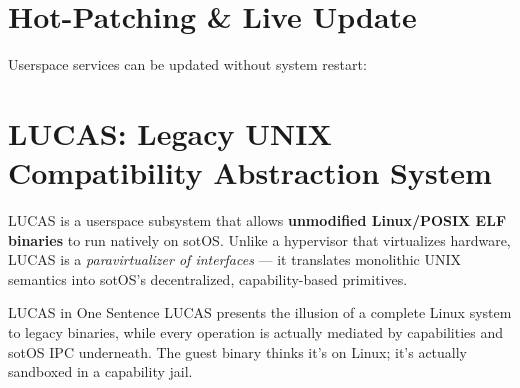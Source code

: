\documentclass[11pt,a4paper]{article}
\begin{document}
\section{Hot-Patching \& Live Update}

Userspace services can be updated without system restart:

\begin{center}
\end{center}

\section{LUCAS: Legacy UNIX Compatibility Abstraction System}

LUCAS is a userspace subsystem that allows \textbf{unmodified Linux/POSIX ELF binaries}
to run natively on sotOS. Unlike a hypervisor that virtualizes hardware,
LUCAS is a \textit{paravirtualizer of interfaces} --- it translates monolithic
UNIX semantics into sotOS's decentralized, capability-based primitives.

\begin{principalbox}{LUCAS in One Sentence}
LUCAS presents the illusion of a complete Linux system to legacy binaries,
while every operation is actually mediated by capabilities and sotOS IPC
underneath. The guest binary thinks it's on Linux; it's actually sandboxed
in a capability jail.
\end{principalbox}
\end{document}
